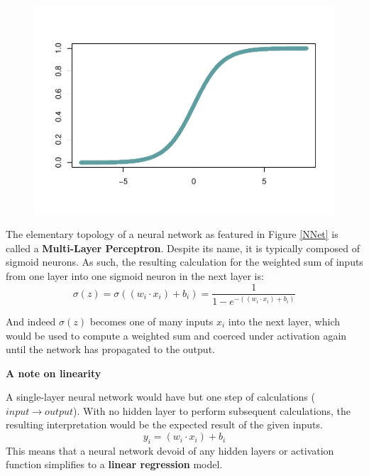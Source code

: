 \begin{figure}[H]
    \centering
    \includegraphics[width = .7\textwidth]{Figures/sigmoid-function-1.pdf}
   \vspace{-40pt}
\end{figure}


The elementary topology of a neural network as featured in Figure \ref{NNet} is called a \textbf{Multi-Layer Perceptron}.  Despite its name, it is typically composed of sigmoid neurons.  As such, the resulting calculation for the weighted sum of inputs from one layer into one sigmoid neuron in the next layer is:
$$
\sigma(z) = \sigma((w_i \cdot x_i) + b_i) = \frac{1}{1-e^{-((w_i \cdot x_i) + b_i)}}
$$

And indeed $\sigma(z)$ becomes one of many inputs $x_i$ into the next layer, which would be used to compute a weighted sum and coerced under activation again until the network has propagated to the output.








\textbf{A note on linearity}

A single-layer neural network would have but one step of calculations ($input \rightarrow output$).  With no hidden layer to perform subsequent calculations, the resulting interpretation would be the expected result of the given inputs.
$$
y_i = (w_i \cdot x_i) + b_i
$$
This means that a neural network devoid of any hidden layers or activation function simplifies to a \textbf{linear regression} model. \cite{sharma2017activation}




